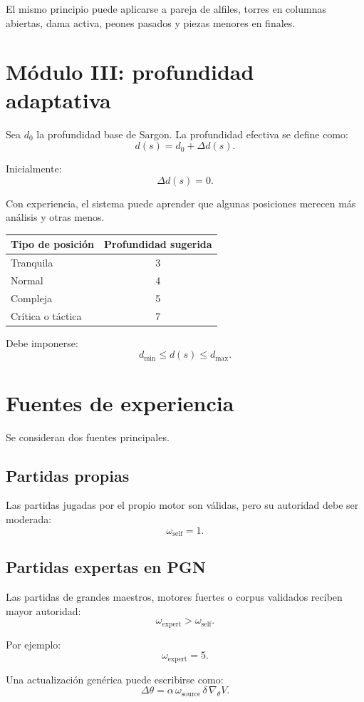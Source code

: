 \documentclass[11pt,a4paper]{article}
\begin{document}
El mismo principio puede aplicarse a pareja de alfiles, torres en columnas abiertas, dama activa, peones pasados y piezas menores en finales.

\section{Módulo III: profundidad adaptativa}
Sea $d_0$ la profundidad base de Sargon. La profundidad efectiva se define como:
\[
d(s)=d_0+\Delta d(s).
\]

Inicialmente:
\[
\Delta d(s)=0.
\]

Con experiencia, el sistema puede aprender que algunas posiciones merecen más análisis y otras menos.

\begin{center}
\begin{tabular}{lc}
\toprule
Tipo de posición & Profundidad sugerida \\
\midrule
Tranquila & 3 \\
Normal & 4 \\
Compleja & 5 \\
Crítica o táctica & 7 \\
\bottomrule
\end{tabular}
\end{center}

Debe imponerse:
\[
d_{\min}\leq d(s)\leq d_{\max}.
\]

\section{Fuentes de experiencia}
Se consideran dos fuentes principales.

\subsection{Partidas propias}
Las partidas jugadas por el propio motor son válidas, pero su autoridad debe ser moderada:
\[
\omega_{\text{self}}=1.
\]

\subsection{Partidas expertas en PGN}
Las partidas de grandes maestros, motores fuertes o corpus validados reciben mayor autoridad:
\[
\omega_{\text{expert}}>\omega_{\text{self}}.
\]

Por ejemplo:
\[
\omega_{\text{expert}}=5.
\]

Una actualización genérica puede escribirse como:
\[
\Delta \theta
=
\alpha\,
\omega_{\text{source}}\,
\delta\,
\nabla_\theta V.
\]
\end{document}
